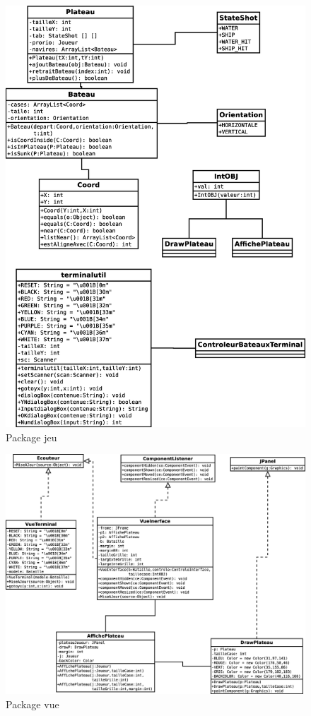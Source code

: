 \documentclass{article}
\begin{document}
\begin{figure}[htp]
\centering
\includegraphics[scale=0.4]{images/Diagramme/package_jeu.eps}
\caption{\label{fig:Jeu}Package jeu}
\end{figure}

\begin{figure}[htp]
\centering
\includegraphics[scale=0.30]{images/Diagramme/package_vue.eps}
\caption{\label{fig:Vue}Package vue}
\end{figure}
\end{document}
